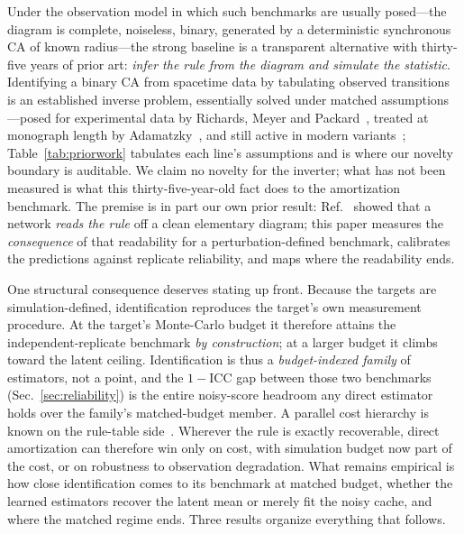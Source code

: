 \documentclass[aip,cha,amsmath,amssymb,reprint,floatfix]{revtex4-2}
\begin{document}
Under the
observation model in which such benchmarks are usually posed---the diagram is
complete, noiseless, binary, generated by a deterministic synchronous CA of
known radius---the strong baseline is a transparent alternative with
thirty-five years of prior art: \emph{infer the rule from the diagram and
simulate the statistic}. Identifying a binary CA from spacetime data by
tabulating observed transitions is an established inverse problem, essentially
solved under matched assumptions---posed for experimental data by Richards,
Meyer and Packard~\cite{richards1990}, treated at monograph length by
Adamatzky~\cite{adamatzky1994}, and still active in modern
variants~\cite{yangbillings2000,sunrosinmartin2011,elser2021,mordvintsev2020};
Table~\ref{tab:priorwork} tabulates each line's assumptions and is where our
novelty boundary is auditable. We claim no
novelty for the inverter; what has not been measured is what this
thirty-five-year-old fact does to the amortization benchmark. The premise is
in part our own prior result: Ref.~ showed that a
network \emph{reads the rule} off a clean elementary diagram; this paper
measures the \emph{consequence} of that readability for a
perturbation-defined benchmark, calibrates the predictions against replicate
reliability, and maps where the readability ends.

One structural
consequence deserves stating up front. Because the targets are
simulation-defined, identification reproduces the target's own measurement
procedure. At the target's Monte-Carlo budget it therefore attains the
independent-replicate benchmark \emph{by construction}; at a larger
budget it climbs toward the latent ceiling. Identification is thus a
\emph{budget-indexed family} of estimators, not a point, and the
$1-\mathrm{ICC}$ gap between those two benchmarks
(Sec.~\ref{sec:reliability}) is the entire noisy-score headroom
any direct estimator holds over the family's matched-budget member. A
parallel cost hierarchy is known on the rule-table
side~\cite{vispoel2026structure}.
Wherever the rule is exactly recoverable, direct amortization can therefore
win only on cost, with simulation budget now part of the cost, or on
robustness to observation degradation. What remains
empirical is how close identification comes to its benchmark at matched
budget, whether the learned estimators recover the latent mean or merely
fit the noisy cache, and where the matched regime ends. Three results
organize everything that follows.
\end{document}
